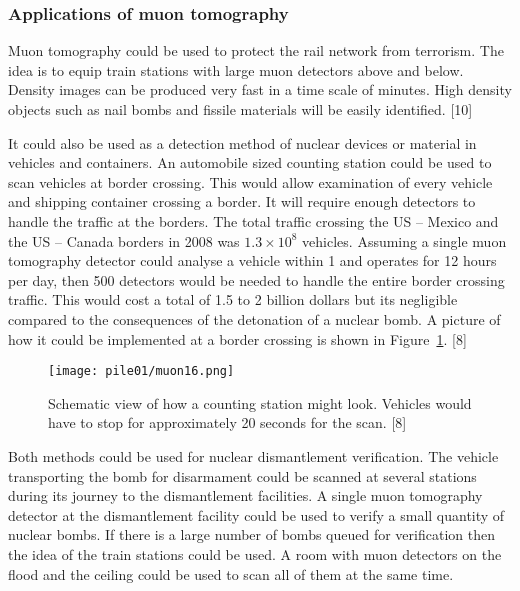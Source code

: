 \documentclass[twocolumn,a4paper]{article}
\begin{document}
\subsubsection{Applications of muon tomography}
Muon tomography could be used to protect the rail network from
terrorism. The idea is to equip train stations with large muon
detectors above and below. Density images can be produced very fast in
a time scale of minutes. High density objects such as nail bombs and
fissile materials will be easily identified. [10]

It could also be used as a detection method of nuclear devices or
material in vehicles and containers.  An automobile sized counting
station could be used to scan vehicles at border crossing. This would
allow examination of every vehicle and shipping container crossing a
border. It will require enough detectors to handle the traffic at the
borders. The total traffic crossing the US -- Mexico and the US --
Canada borders in 2008 was \(1.3\times10^8\) vehicles. Assuming a
single muon tomography detector could analyse a vehicle within
\unit{1}{\minute} and operates for 12 hours per day, then 500
detectors would be needed to handle the entire border crossing
traffic. This would cost a total of 1.5 to 2 billion dollars but its
negligible compared to the consequences of the detonation of a nuclear
bomb. A picture of how it could be implemented at a border crossing is
shown in Figure~\ref{fig:muon16}. [8]

\begin{figure}
  \texttt{[image: pile01/muon16.png]}
  \caption{Schematic view of how a counting station might
    look. Vehicles would have to stop for approximately 20 seconds for
    the scan. [8]}
  \label{fig:muon16}
\end{figure}

Both methods could be used for nuclear dismantlement verification. The
vehicle transporting the bomb for disarmament could be scanned at
several stations during its journey to the dismantlement facilities. A
single muon tomography detector at the dismantlement facility could be
used to verify a small quantity of nuclear bombs. If there is a large
number of bombs queued for verification then the idea of the train
stations could be used. A room with muon detectors on the flood and
the ceiling could be used to scan all of them at the same time.
\end{document}
